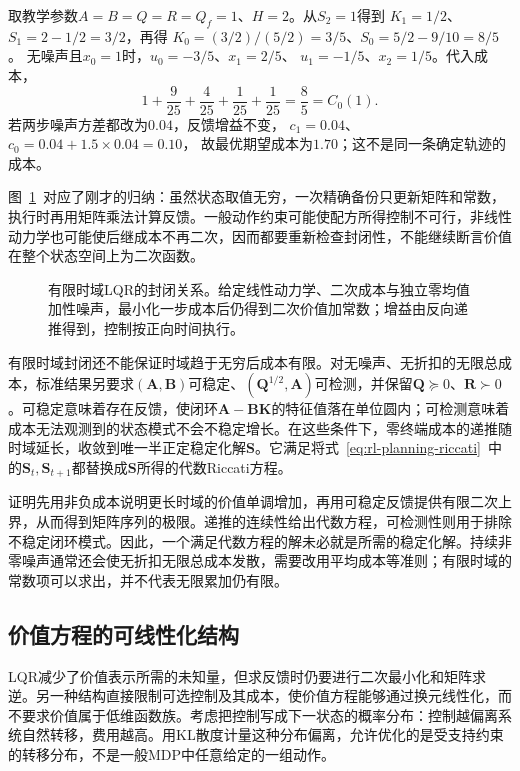 \begin{example}[标量Riccati递推]
 \label{ex:rl-planning-lqr}
 取教学参数$A=B=Q=R=Q_f=1$、$H=2$。从$S_2=1$得到
 $K_1=1/2$、$S_1=2-1/2=3/2$，再得
 $K_0=(3/2)/(5/2)=3/5$、$S_0=5/2-9/10=8/5$。
 无噪声且$x_0=1$时，$u_0=-3/5$、$x_1=2/5$、
 $u_1=-1/5$、$x_2=1/5$。代入成本，
 \[
 1+\frac{9}{25}+\frac{4}{25}+\frac{1}{25}+\frac{1}{25}
 =\frac85=C_0(1).
 \]
 若两步噪声方差都改为$0.04$，反馈增益不变，
 $c_1=0.04$、$c_0=0.04+1.5\times0.04=0.10$，
 故最优期望成本为$1.70$；这不是同一条确定轨迹的成本。
\end{example}

图~\ref{fig:rl-planning-lqr-closure}~对应了刚才的归纳：虽然状态取值无穷，一次精确备份只更新矩阵和常数，执行时再用矩阵乘法计算反馈。一般动作约束可能使配方所得控制不可行，非线性动力学也可能使后继成本不再二次，因而都要重新检查封闭性，不能继续断言价值在整个状态空间上为二次函数。

\begin{figure}[htbp]
 \centering
 
 \caption{有限时域LQR的封闭关系。给定线性动力学、二次成本与独立零均值加性噪声，最小化一步成本后仍得到二次价值加常数；增益由反向递推得到，控制按正向时间执行。}
 \label{fig:rl-planning-lqr-closure}
\end{figure}

有限时域封闭还不能保证时域趋于无穷后成本有限。对无噪声、无折扣的无限总成本，标准结果另要求$(\bm A,\bm B)$可稳定、$(\bm Q^{1/2},\bm A)$可检测，并保留$\bm Q\succeq0$、$\bm R\succ0$。可稳定意味着存在反馈，使闭环$\bm A-\bm B\bm K$的特征值落在单位圆内；可检测意味着成本无法观测到的状态模式不会不稳定增长。在这些条件下，零终端成本的递推随时域延长，收敛到唯一半正定稳定化解$\bm S$。它满足将式~\eqref{eq:rl-planning-riccati}~中的$\bm S_t,\bm S_{t+1}$都替换成$\bm S$所得的代数Riccati方程。

证明先用非负成本说明更长时域的价值单调增加，再用可稳定反馈提供有限二次上界，从而得到矩阵序列的极限。递推的连续性给出代数方程，可检测性则用于排除不稳定闭环模式。因此，一个满足代数方程的解未必就是所需的稳定化解。持续非零噪声通常还会使无折扣无限总成本发散，需要改用平均成本等准则；有限时域的常数项可以求出，并不代表无限累加仍有限。

\subsection{价值方程的可线性化结构}
\label{sec:rl-planning-kl-control}

LQR减少了价值表示所需的未知量，但求反馈时仍要进行二次最小化和矩阵求逆。另一种结构直接限制可选控制及其成本，使价值方程能够通过换元线性化，而不要求价值属于低维函数族。考虑把控制写成下一状态的概率分布：控制越偏离系统自然转移，费用越高。用KL散度计量这种分布偏离，允许优化的是受支持约束的转移分布，不是一般MDP中任意给定的一组动作。

